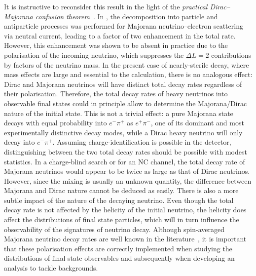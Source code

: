 It is instructive to reconsider this result in the light of the %
\emph{practical Dirac--Majorana confusion theorem}~\cite{Kayser:1981nw, Kayser:1982br}.
In , the decomposition into particle and antiparticle processes was performed for %
Majorana neutrino--electron scattering via neutral current, leading to a factor of two enhancement in the total rate.
However, this enhancement was shown to be absent in practice due to the polarisation of the incoming neutrino, %
which suppresses the $\Delta L = 2$ contributions by factors of the neutrino mass. 
In the present case of nearly-sterile decay, where mass effects are large and essential to the calculation, %
there is no analogous effect: Dirac and Majorana neutrinos will have distinct total decay rates regardless of their polarisation. 
Therefore, the total decay rates of heavy neutrinos into observable final states could in principle allow to determine %
the Majorana/Dirac nature of the initial state.
This is not a trivial effect: a pure Majorana state decays with equal probability into $e^-\pi^+$ as $e^+ \pi^-$, %
one of its dominant and most experimentally distinctive decay modes, while a Dirac heavy neutrino %
will only decay into $e^-\pi^+$.
%
Assuming charge-identification is possible in the detector, distinguishing between the two total decay rates %
should be possible with modest statistics. %
In a charge-blind search or for an NC channel, the total decay rate of Majorana neutrinos would appear %
to be twice as large as that of Dirac neutrinos.
However, since the mixing is usually an unknown quantity, the difference between Majorana and Dirac nature cannot be deduced as easily.
There is also a more subtle impact of the nature of the decaying neutrino.
Even though the total decay rate is not affected by the helicity of the initial neutrino, %
the helicity does affect the distributions of final state particles, which will in turn influence the observability of %
the signatures of neutrino decay. 
Although spin-averaged Majorana neutrino decay rates are well known in the %
literature~\cite{Atre:2009rg,Gorbunov:2007ak,Helo:2010cw,Bondarenko:2018ptm}, %
it is important that these polarisation effects are correctly implemented when studying the distributions of %
final state observables and subsequently when developing an analysis to tackle backgrounds. 

